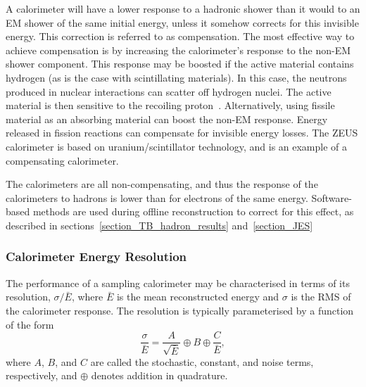 A calorimeter will have a lower response to a hadronic shower than it would to an EM shower of the same initial energy, unless it somehow corrects for this invisible energy. This correction is referred to as compensation.
 The most effective way to achieve compensation is by increasing the calorimeter's response to the non-EM shower component. This response may be boosted if the active material contains hydrogen (as is the case with scintillating materials). In this case, the neutrons produced in nuclear interactions can scatter off hydrogen nuclei. The active material is then sensitive to the recoiling proton~\cite{wigmans2008calorimetry}. Alternatively, using fissile material as an absorbing material can boost the non-EM response. Energy released in fission reactions can compensate for invisible energy losses. The ZEUS\cite{zeus} calorimeter is based on uranium/scintillator technology, and is an example of a compensating calorimeter.
 
 
  
The \atlas calorimeters are all non-compensating, and thus the response of the calorimeters to hadrons is lower than for electrons of the same energy. Software-based methods are used during offline reconstruction to correct for this effect, as described in sections~\ref{section_TB_hadron_results} and~\ref{section_JES}

\subsubsection{Calorimeter Energy Resolution}

The performance of a sampling calorimeter may be characterised in terms of its resolution, $\sigma/\bar{E}$, where $\bar{E}$ is the mean reconstructed energy and $\sigma$ is the RMS of the calorimeter response. The resolution is typically parameterised by a function of the form
\begin{equation}
\frac{\sigma}{\bar{E}} = \frac{A}{\sqrt{\bar{E}}} \oplus B \oplus \frac{C}{\bar{E}},
\label{eqn_resolution_general}
\end{equation}
where $A$, $B$, and $C$ are called the stochastic, constant, and noise terms, respectively, and $\oplus$ denotes addition in quadrature.

